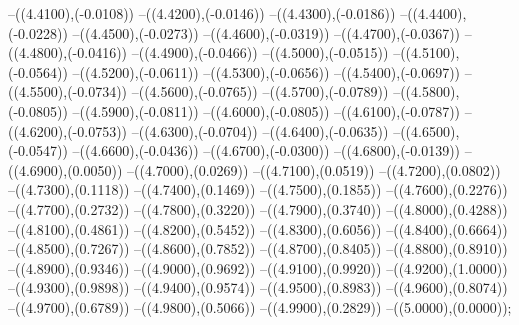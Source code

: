 {	--({\sx*(4.4100)},{\sy*(-0.0108)})
	--({\sx*(4.4200)},{\sy*(-0.0146)})
	--({\sx*(4.4300)},{\sy*(-0.0186)})
	--({\sx*(4.4400)},{\sy*(-0.0228)})
	--({\sx*(4.4500)},{\sy*(-0.0273)})
	--({\sx*(4.4600)},{\sy*(-0.0319)})
	--({\sx*(4.4700)},{\sy*(-0.0367)})
	--({\sx*(4.4800)},{\sy*(-0.0416)})
	--({\sx*(4.4900)},{\sy*(-0.0466)})
	--({\sx*(4.5000)},{\sy*(-0.0515)})
	--({\sx*(4.5100)},{\sy*(-0.0564)})
	--({\sx*(4.5200)},{\sy*(-0.0611)})
	--({\sx*(4.5300)},{\sy*(-0.0656)})
	--({\sx*(4.5400)},{\sy*(-0.0697)})
	--({\sx*(4.5500)},{\sy*(-0.0734)})
	--({\sx*(4.5600)},{\sy*(-0.0765)})
	--({\sx*(4.5700)},{\sy*(-0.0789)})
	--({\sx*(4.5800)},{\sy*(-0.0805)})
	--({\sx*(4.5900)},{\sy*(-0.0811)})
	--({\sx*(4.6000)},{\sy*(-0.0805)})
	--({\sx*(4.6100)},{\sy*(-0.0787)})
	--({\sx*(4.6200)},{\sy*(-0.0753)})
	--({\sx*(4.6300)},{\sy*(-0.0704)})
	--({\sx*(4.6400)},{\sy*(-0.0635)})
	--({\sx*(4.6500)},{\sy*(-0.0547)})
	--({\sx*(4.6600)},{\sy*(-0.0436)})
	--({\sx*(4.6700)},{\sy*(-0.0300)})
	--({\sx*(4.6800)},{\sy*(-0.0139)})
	--({\sx*(4.6900)},{\sy*(0.0050)})
	--({\sx*(4.7000)},{\sy*(0.0269)})
	--({\sx*(4.7100)},{\sy*(0.0519)})
	--({\sx*(4.7200)},{\sy*(0.0802)})
	--({\sx*(4.7300)},{\sy*(0.1118)})
	--({\sx*(4.7400)},{\sy*(0.1469)})
	--({\sx*(4.7500)},{\sy*(0.1855)})
	--({\sx*(4.7600)},{\sy*(0.2276)})
	--({\sx*(4.7700)},{\sy*(0.2732)})
	--({\sx*(4.7800)},{\sy*(0.3220)})
	--({\sx*(4.7900)},{\sy*(0.3740)})
	--({\sx*(4.8000)},{\sy*(0.4288)})
	--({\sx*(4.8100)},{\sy*(0.4861)})
	--({\sx*(4.8200)},{\sy*(0.5452)})
	--({\sx*(4.8300)},{\sy*(0.6056)})
	--({\sx*(4.8400)},{\sy*(0.6664)})
	--({\sx*(4.8500)},{\sy*(0.7267)})
	--({\sx*(4.8600)},{\sy*(0.7852)})
	--({\sx*(4.8700)},{\sy*(0.8405)})
	--({\sx*(4.8800)},{\sy*(0.8910)})
	--({\sx*(4.8900)},{\sy*(0.9346)})
	--({\sx*(4.9000)},{\sy*(0.9692)})
	--({\sx*(4.9100)},{\sy*(0.9920)})
	--({\sx*(4.9200)},{\sy*(1.0000)})
	--({\sx*(4.9300)},{\sy*(0.9898)})
	--({\sx*(4.9400)},{\sy*(0.9574)})
	--({\sx*(4.9500)},{\sy*(0.8983)})
	--({\sx*(4.9600)},{\sy*(0.8074)})
	--({\sx*(4.9700)},{\sy*(0.6789)})
	--({\sx*(4.9800)},{\sy*(0.5066)})
	--({\sx*(4.9900)},{\sy*(0.2829)})
	--({\sx*(5.0000)},{\sy*(0.0000)});
}
